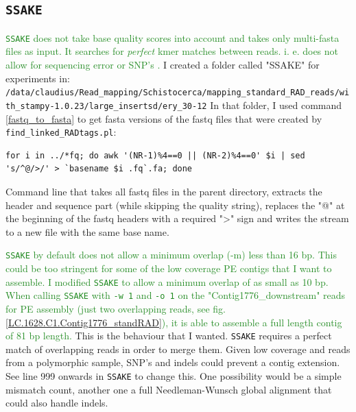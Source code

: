 \documentclass{article}\usepackage[]{graphicx}\usepackage[]{color}
\newcommand{\roger}[1]{ \textcolor[named]{ForestGreen}{#1} }
\begin{document}

\subsection{\texttt{SSAKE}}

\roger{\texttt{SSAKE} does not take base quality scores into account and takes only multi-fasta files as input. It searches for \emph{perfect} kmer matches between reads. i. e. does not allow for sequencing error or SNP's \citep{Warren2007}. }
I created a folder called "SSAKE" for experiments in: \\
{\scriptsize{
\texttt{/data/claudius/Read\_mapping/Schistocerca/mapping\_standard\_RAD\_reads/with\_stampy-1.0.23/large\_insertsd/ery\_30-12}
}}
In that folder, I used command \ref{fastq_to_fasta} to get fasta versions of the fastq files that were created by \texttt{find\_linked\_RADtags.pl}:

\begin{command}
\captionsetup{type=command}
\begin{Verbatim}[fontsize=\footnotesize]
for i in ../*fq; do awk '(NR-1)%4==0 || (NR-2)%4==0' $i | sed 's/^@/>/' > `basename $i .fq`.fa; done
\end{Verbatim}
\caption{Command line that takes all fastq files in the parent directory, extracts the header and sequence part (while skipping the quality string), replaces the "@" at the beginning of the fastq headers with a required ">" sign and writes the stream to a new file with the same base name.}
\label{fastq_to_fasta}
\end{command}

\roger{\texttt{SSAKE} by default does not allow a minimum overlap (-m) less than 16 bp. This could be too stringent for some of the low coverage PE contigs that I want to assemble. I modified \texttt{SSAKE} to allow a minimum overlap of as small as 10 bp. When calling \texttt{SSAKE} with \texttt{-w 1} and \texttt{-o 1} on the "Contig1776\_downstream" reads for PE assembly (just two overlapping reads, see fig. \ref{LC.1628.C1.Contig1776_standRAD}), it is able to assemble a full length contig of 81 bp length.} This is the behaviour that I wanted. \texttt{SSAKE} requires a perfect match of overlapping reads in order to merge them. Given low coverage and reads from a polymorphic sample, SNP's and indels could prevent a contig extension. See line 999 onwards in \texttt{SSAKE} to change this. One possibility would be a simple mismatch count, another one a full Needleman-Wunsch global alignment that could also handle indels.
\end{document}
